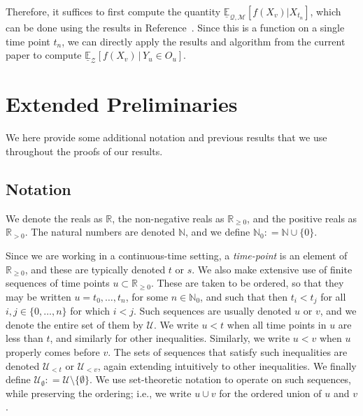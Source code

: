 \documentclass[twoside,11pt]{article}
\newcommand{\nats}{\mathbb{N}}
\newcommand{\natswith}{\nats_{0}}
\newcommand{\reals}{\mathbb{R}}
\newcommand{\realspos}{\reals_{>0}}
\newcommand{\realsnonneg}{\reals_{\geq 0}}
\newcommand{\lexp}{\underline{\mathbb{E}}_{\rateset,\mathcal{M}}}
\newcommand{\rateset}{\mathcal{Q}}
\newcommand{\coloneqq}{:\!=}
\begin{document}
Therefore, it suffices to first compute the quantity $\lexp[f(X_v)\vert X_{t_n}]$, which can be done using the results in Reference~\citep{krak2016ictmc}. Since this is a function on a single time point $t_n$, we can directly apply the results and algorithm from the current paper to compute $\underline{\mathbb{E}}_{\mathcal{Z}}[f(X_v)\,\vert\,Y_u\in O_u].$%

\appendix
{}

%


\newpage


\section{Extended Preliminaries}

We here provide some additional notation and previous results that we use throughout the proofs of our results.

\subsection{Notation}

We denote the reals as $\reals$, the non-negative reals as $\realsnonneg$, and the positive reals as $\realspos$. The natural numbers are denoted $\nats$, and we define $\natswith\coloneqq\nats\cup\{0\}$.

Since we are working in a continuous-time setting, a \emph{time-point} is an element of $\realsnonneg$, and these are typically denoted $t$ or $s$. We also make extensive use of finite sequences of time points $u\subset\realsnonneg$. These are taken to be ordered, so that they may be written $u=t_0,\ldots,t_n$, for some $n\in\natswith$, and such that then $t_i<t_j$ for all $i,j\in\{0,\ldots,n\}$ for which $i< j$. Such sequences are usually denoted $u$ or $v$, and we denote the entire set of them by $\mathcal{U}$. We write $u<t$ when all time points in $u$ are less than $t$, and similarly for other inequalities. Similarly, we write $u<v$ when $u$ properly comes before $v$. The sets of sequences that satisfy such inequalities are denoted $\mathcal{U}_{<t}$ or $\mathcal{U}_{<v}$, again extending intuitively to other inequalities. We finally define $\mathcal{U}_\emptyset\coloneqq \mathcal{U}\setminus\{\emptyset\}$. We use set-theoretic notation to operate on such sequences, while preserving the ordering; i.e., we write $u\cup v$ for the ordered union of $u$ and $v$.
\end{document}
